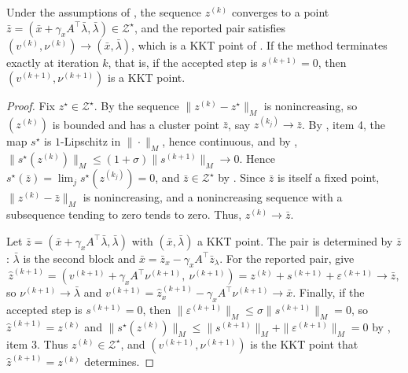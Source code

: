 \documentclass[11pt]{article}
\begin{document}
\begin{proposition}\label{prop:iterate-convergence}
    Under the assumptions of , the sequence $z^{(k)}$ converges to a point $\bar z = (\bar x + \gamma_x A^\top\bar\lambda, \bar\lambda) \in \mathcal{Z}^\star$, and the reported pair satisfies $(v^{(k)}, \nu^{(k)}) \to (\bar x, \bar\lambda)$, which is a KKT point of .
    If the method terminates exactly at iteration $k$, that is, if the accepted step is $s^{(k+1)} = 0$, then $(v^{(k+1)}, \nu^{(k+1)})$ is a KKT point.
\end{proposition}
\begin{proof}
    Fix $z^\star \in \mathcal{Z}^\star$.
    By  the sequence $\|z^{(k)} - z^\star\|_M$ is nonincreasing, so $(z^{(k)})$ is bounded and has a cluster point $\bar z$, say $z^{(k_j)} \to \bar z$.
    By , item 4, the map $s^\star$ is $1$-Lipschitz in $\|\cdot\|_M$, hence continuous, and by , $\|s^\star(z^{(k)})\|_M \leq (1 + \sigma)\|s^{(k+1)}\|_M \to 0$.
    Hence $s^\star(\bar z) = \lim_j s^\star(z^{(k_j)}) = 0$, and $\bar z \in \mathcal{Z}^\star$ by .
    Since $\bar z$ is itself a fixed point, $\|z^{(k)} - \bar z\|_M$ is nonincreasing, and a nonincreasing sequence with a subsequence tending to zero tends to zero.
    Thus, $z^{(k)} \to \bar z$.
    
    Let $\bar z = (\bar x + \gamma_x A^\top\bar\lambda, \bar\lambda)$ with $(\bar x, \bar\lambda)$ a KKT point.
    The pair is determined by $\bar z$: $\bar\lambda$ is the second block and $\bar x = \bar z_x - \gamma_x A^\top\bar z_\lambda$.
    For the reported pair,  give
    \begin{equation*}
        \hat z^{(k+1)} = (v^{(k+1)} + \gamma_x A^\top\nu^{(k+1)},\ \nu^{(k+1)}) = z^{(k)} + s^{(k+1)} + \varepsilon^{(k+1)} \to \bar z,
    \end{equation*}
    so $\nu^{(k+1)} \to \bar\lambda$ and $v^{(k+1)} = \hat z^{(k+1)}_x - \gamma_x A^\top\nu^{(k+1)} \to \bar x$.
    Finally, if the accepted step is $s^{(k+1)} = 0$, then $\|\varepsilon^{(k+1)}\|_M \leq \sigma\|s^{(k+1)}\|_M = 0$, so $\hat z^{(k+1)} = z^{(k)}$ and $\|s^\star(z^{(k)})\|_M \leq \|s^{(k+1)}\|_M + \|\varepsilon^{(k+1)}\|_M = 0$ by , item 3.
    Thus $z^{(k)} \in \mathcal{Z}^\star$, and $(v^{(k+1)}, \nu^{(k+1)})$ is the KKT point that $\hat z^{(k+1)} = z^{(k)}$ determines.
\end{proof}
\end{document}
